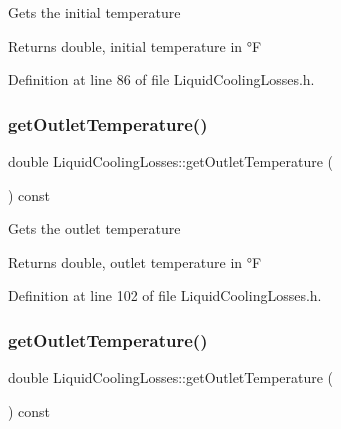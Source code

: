 Gets the initial temperature \begin{DoxyReturn}{Returns}
double, initial temperature in °F 
\end{DoxyReturn}


Definition at line 86 of file Liquid\+Cooling\+Losses.\+h.

\mbox{\label{class_liquid_cooling_losses_ae6364da9b374e95dd657096350464acb}} 
\subsubsection{\texorpdfstring{get\+Outlet\+Temperature()}{getOutletTemperature()}\hspace{0.1cm}{\footnotesize\ttfamily [1/3]}}
{\footnotesize\ttfamily double Liquid\+Cooling\+Losses\+::get\+Outlet\+Temperature (\begin{DoxyParamCaption}{ }\end{DoxyParamCaption}) const\hspace{0.3cm}{\ttfamily [inline]}}

Gets the outlet temperature \begin{DoxyReturn}{Returns}
double, outlet temperature in °F 
\end{DoxyReturn}


Definition at line 102 of file Liquid\+Cooling\+Losses.\+h.

\mbox{\label{class_liquid_cooling_losses_ae6364da9b374e95dd657096350464acb}} 
\subsubsection{\texorpdfstring{get\+Outlet\+Temperature()}{getOutletTemperature()}\hspace{0.1cm}{\footnotesize\ttfamily [2/3]}}
{\footnotesize\ttfamily double Liquid\+Cooling\+Losses\+::get\+Outlet\+Temperature (\begin{DoxyParamCaption}{ }\end{DoxyParamCaption}) const\hspace{0.3cm}{\ttfamily [inline]}}

